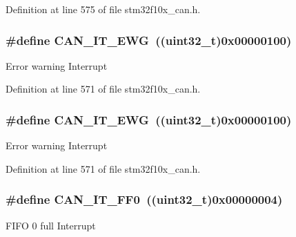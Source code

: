 Definition at line 575 of file stm32f10x\+\_\+can.\+h.

\subsubsection[{\texorpdfstring{C\+A\+N\+\_\+\+I\+T\+\_\+\+E\+WG}{CAN_IT_EWG}}]{\setlength{\rightskip}{0pt plus 5cm}\#define C\+A\+N\+\_\+\+I\+T\+\_\+\+E\+WG~(({\bf uint32\+\_\+t})0x00000100)}\hypertarget{group___c_a_n__interrupts_ga8a9f04ddf6ebe169d32b951a8ea135b3}{}\label{group___c_a_n__interrupts_ga8a9f04ddf6ebe169d32b951a8ea135b3}
Error warning Interrupt 

Definition at line 571 of file stm32f10x\+\_\+can.\+h.

\subsubsection[{\texorpdfstring{C\+A\+N\+\_\+\+I\+T\+\_\+\+E\+WG}{CAN_IT_EWG}}]{\setlength{\rightskip}{0pt plus 5cm}\#define C\+A\+N\+\_\+\+I\+T\+\_\+\+E\+WG~(({\bf uint32\+\_\+t})0x00000100)}\hypertarget{group___c_a_n__interrupts_ga8a9f04ddf6ebe169d32b951a8ea135b3}{}\label{group___c_a_n__interrupts_ga8a9f04ddf6ebe169d32b951a8ea135b3}
Error warning Interrupt 

Definition at line 571 of file stm32f10x\+\_\+can.\+h.

\subsubsection[{\texorpdfstring{C\+A\+N\+\_\+\+I\+T\+\_\+\+F\+F0}{CAN_IT_FF0}}]{\setlength{\rightskip}{0pt plus 5cm}\#define C\+A\+N\+\_\+\+I\+T\+\_\+\+F\+F0~(({\bf uint32\+\_\+t})0x00000004)}\hypertarget{group___c_a_n__interrupts_gabf63043d9216de80ddc7ffe57b23ef67}{}\label{group___c_a_n__interrupts_gabf63043d9216de80ddc7ffe57b23ef67}
F\+I\+FO 0 full Interrupt 

